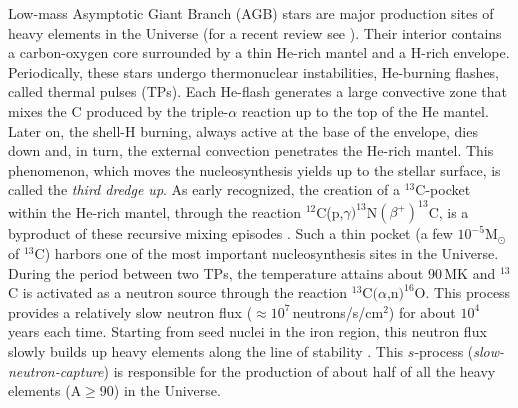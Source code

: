 \documentclass[%
reprint,
groupedaddress,
showpacs,
nofootinbib,
amsmath,amssymb,
aps,
prl,
superscriptaddress,
notitlepage,
floatfix
]{revtex4-2}
\begin{document}
\maketitle
Low-mass Asymptotic Giant Branch (AGB) stars are major production sites of heavy elements in the Universe (for a recent review see \cite{Sneden:2008}). Their interior contains a carbon-oxygen core surrounded by a thin He-rich mantel and a H-rich envelope. Periodically, these stars undergo thermonuclear instabilities, He-burning flashes, called thermal pulses (TPs). Each He-flash generates a large convective zone that mixes the C produced by the triple-$\alpha$ reaction up to the top of the He mantel. Later on, the shell-H burning, always active at the base of the envelope, dies down and, in turn, the external convection penetrates the He-rich mantel.  
This phenomenon, which moves the nucleosynthesis yields up to the stellar surface, is called the \emph{third dredge up}. As early recognized, the creation of a $^{13}$C-pocket within the He-rich mantel, through the reaction $^{12}$C(p,$\gamma)^{13}$N$(\beta^+)^{13}$C, is a byproduct of these recursive mixing episodes \cite{Straniero:2006,gallino:1998}. Such a thin pocket (a few $10^{-5}$M$_\odot$ of $^{13}$C) harbors one of the most important nucleosynthesis sites in the Universe.  
During the period between two TPs, the temperature attains about 90\,MK and $^{13}$C is activated as a neutron source through the reaction $^{13}$C$(\alpha$,n$)^{16}$O.
This process provides a relatively slow neutron flux ($\approx 10^{7}$\,neutrons/s/cm$^2$) for about $10^4$ years each time. Starting from seed nuclei in the iron region, this neutron flux slowly builds up heavy elements along the line of stability \cite{Kaeppeler:2011}.
This $s$-process (\emph{slow-neutron-capture}) is responsible for the production of about half of all the heavy elements (A$\geq 90$) in the Universe.
\end{document}
